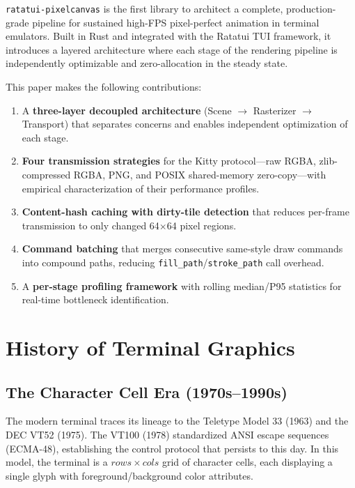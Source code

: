 \documentclass[11pt, a4paper, twocolumn]{article}
\begin{document}
\texttt{ratatui-pixelcanvas} is the first library to architect a complete, production-grade pipeline for sustained high-FPS pixel-perfect animation in terminal emulators.
Built in Rust and integrated with the Ratatui TUI framework, it introduces a layered architecture where each stage of the rendering pipeline is independently optimizable and zero-allocation in the steady state.

This paper makes the following contributions:

\begin{enumerate}[leftmargin=1.5em, itemsep=0.2em]
    \item A \textbf{three-layer decoupled architecture} (Scene $\to$ Rasterizer $\to$ Transport) that separates concerns and enables independent optimization of each stage.
    \item \textbf{Four transmission strategies} for the Kitty protocol---raw RGBA, zlib-compressed RGBA, PNG, and POSIX shared-memory zero-copy---with empirical characterization of their performance profiles.
    \item \textbf{Content-hash caching with dirty-tile detection} that reduces per-frame transmission to only changed 64$\times$64 pixel regions.
    \item \textbf{Command batching} that merges consecutive same-style draw commands into compound paths, reducing \texttt{fill\_path}/\texttt{stroke\_path} call overhead.
    \item A \textbf{per-stage profiling framework} with rolling median/P95 statistics for real-time bottleneck identification.
\end{enumerate}

\section{History of Terminal Graphics}
\label{sec:history}

\subsection{The Character Cell Era (1970s--1990s)}

The modern terminal traces its lineage to the Teletype Model 33 (1963) and the DEC VT52 (1975).
The VT100 (1978) standardized ANSI escape sequences (ECMA-48), establishing the control protocol that persists to this day.
In this model, the terminal is a $rows \times cols$ grid of character cells, each displaying a single glyph with foreground/background color attributes.
\end{document}
